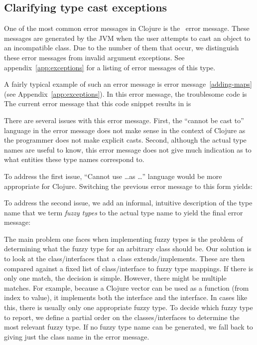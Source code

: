 \documentclass[12pt]{article}
\begin{document}
\subsection{Clarifying type cast exceptions}\label{subsec:typecast}
One of the most common error messages in Clojure is the \cce~error
message. These messages are generated by the JVM when the user attempts to cast
an object to an incompatible class. Due to the number of them that occur, we
distinguish these error messages from invalid argument exceptions. See
appendix~\ref{app:exceptions} for a listing of error messages of this type.

A fairly typical example of such an error message is error
message~\ref{adding-maps}  (see Appendix~\ref{app:exceptions}). In
this error message, the troublesome code is 
The current  error message that this code snippet results in is

There are several issues with this error message. First, the ``cannot be cast to''
language in the error message does not make sense in the context of Clojure as the programmer
does not make explicit casts. Second, although the actual
type names are useful to know, this error message does not give much indication
as to what entities these type names correspond to.

To address the first issue, ``Cannot use \ldots as \ldots'' language would be
more appropriate for Clojure. Switching the previous error message to this
form yields:

To address the second issue, we add an informal, intuitive description of the
type name that we term \emph{fuzzy types} to the actual type name to yield the
final error message:

The main problem one faces when implementing fuzzy types is the problem of determining
what the fuzzy type for an arbitrary class should be. Our solution is to look at
the class/interfaces that a class extends/implements. These are then compared
against a fixed list of class/interface to fuzzy type mappings. If there is only
one match, the decision is simple. However, there might be multiple matches. For
example, because a Clojure vector can be used as a function (from index to
value), it implements both the
interface and the  interface. In cases like this, there
is usually only one appropriate fuzzy type. To decide which fuzzy type to
report, we define a partial order on the classes/interfaces to determine the
most relevant fuzzy type. If no fuzzy type name can be generated, we fall back
to giving just the class name in the error message.
\end{document}
